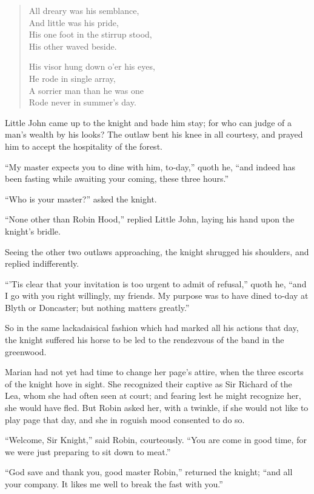 \begin{quote}
All dreary was his semblance,\\
And little was his pride,\\
His one foot in the stirrup stood,\\
His other waved beside.

His visor hung down o'er his eyes,\\
He rode in single array,\\
A sorrier man than he was one\\
Rode never in summer's day.
\end{quote}

Little John came up to the knight and bade him stay; for who can judge
of a man's wealth by his looks? The outlaw bent his knee in all
courtesy, and prayed him to accept the hospitality of the forest.

``My master expects you to dine with him, to-day,'' quoth he, ``and
indeed has been fasting while awaiting your coming, these three hours.''

``Who is your master?'' asked the knight.

``None other than Robin Hood,'' replied Little John, laying his hand
upon the knight's bridle.

Seeing the other two outlaws approaching, the knight shrugged his
shoulders, and replied indifferently.

``'Tis clear that your invitation is too urgent to admit of refusal,''
quoth he, ``and I go with you right willingly, my friends. My purpose
was to have dined to-day at Blyth or Doncaster; but nothing matters
greatly.''

So in the same lackadaisical fashion which had marked all his actions
that day, the knight suffered his horse to be led to the rendezvous of
the band in the greenwood.

Marian had not yet had time to change her page's attire, when the three
escorts of the knight hove in sight. She recognized their captive as Sir
Richard of the Lea, whom she had often seen at court; and fearing lest
he might recognize her, she would have fled. But Robin asked her, with a
twinkle, if she would not like to play page that day, and she in roguish
mood consented to do so.

``Welcome, Sir Knight,'' said Robin, courteously. ``You are come in good
time, for we were just preparing to sit down to meat.''

``God save and thank you, good master Robin,'' returned the knight;
``and all your company. It likes me well to break the fast with you.''

